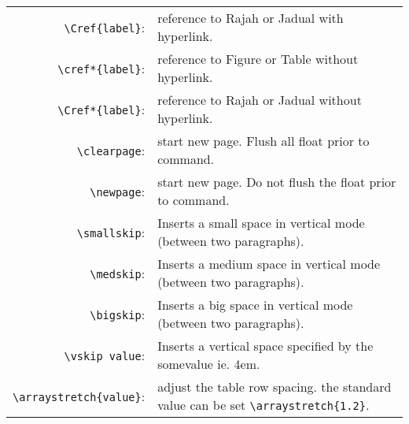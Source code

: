 \documentclass[11pt]{article}
\begin{document}
\begin{table}[H]
\begin{tabularx}{\linewidth}{r X}
		\verb|\Cref{label}|: & reference to Rajah or Jadual  with hyperlink.\\		 
		
		\verb|\cref*{label}|: & reference to Figure or Table without hyperlink.\\
		
		\verb|\Cref*{label}|: & reference to Rajah or Jadual  without hyperlink.\\		
		
		\verb|\clearpage|: & start new page. Flush all float prior to command. \\
		
		\verb|\newpage|: & start new page. Do not flush the float prior to command.\\
		
		\verb|\smallskip|: & Inserts a small space in vertical mode (between two paragraphs).\\
		
		\verb|\medskip|: & Inserts a medium space in vertical mode (between two paragraphs).\\
		
		\verb|\bigskip|: & Inserts a big space in vertical mode (between two paragraphs).\\
		
		\verb|\vskip value|: & Inserts a vertical space specified by the somevalue ie. 4em. \\
		\verb|\arraystretch{value}|: & adjust the table row spacing. the standard value can be set \verb|\arraystretch{1.2}|.  
	\end{tabularx}
\end{table}
\end{document}
